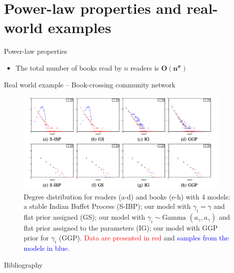 \documentclass[aspectratio=169,xcolor=dvipsnames]{beamer}
\begin{document}
\section{Power-law properties and real-world examples}
\begin{frame}{Power-law properties}
\begin{itemize}[<+->]
    \item The total number of books read by $n$ readers is $\boldsymbol{O(n^{\sigma})}$ \\
\end{itemize}

\end{frame}
\begin{frame}{Real world example – Book-crossing community network}
\begin{figure}
    \centering
    \includegraphics[keepaspectratio, height = 5cm]{utilities/movies_actors.png}
    \caption{Degree distribution  for readers (a-d) and books (e-h) with 4 models: a stable Indian Buffet Process (S-IBP); our model with $\gamma_{i}=\gamma$ and flat prior assigned (GS); our model with $\gamma_{i} \sim \text{Gamma}$ $(a_{\gamma}, a_{\gamma})$ and flat prior assigned to the parameters (IG); our model with GGP prior for $\gamma_{i}$ (GGP). \textcolor{red}{Data are presented in red } and \textcolor{blue}{samples from the models in blue}.}
    \label{fig:movies}
\end{figure}

    
\end{frame}
\begin{frame}[allowframebreaks]{Bibliography}

\nocite{Caron2012BayesianNM, cinlar2011probability, James_Lijoi_Pruenster_2009, kingman_93}

\end{frame}
\end{document}
